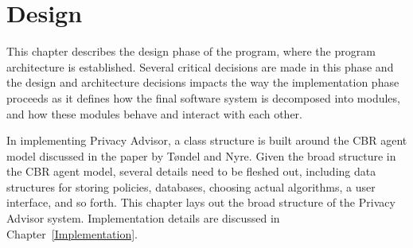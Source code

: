  

\chapter{Design}
\label{design}

\minitoc

This chapter describes the design phase of the program, where the program architecture is established. Several critical decisions are made in this phase and the design and architecture decisions impacts the way the implementation phase proceeds as it defines how the final software system is decomposed into modules, and how these modules behave and interact with each other. 

In implementing Privacy Advisor, a class structure is built around the CBR agent model discussed in the paper by T{\o}ndel and Nyre. Given the broad structure in the CBR agent model, several details need to be fleshed out, including data structures for storing policies, databases, choosing actual algorithms, a user interface, and so forth. This chapter lays out the broad structure of the Privacy Advisor system. Implementation details are discussed in Chapter~\ref{Implementation}.



